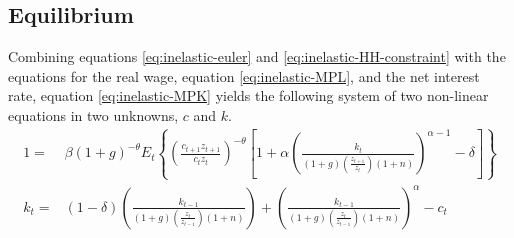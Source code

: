 \documentclass[11pt]{article}
\begin{document}
\subsection{Equilibrium}
Combining equations \ref{eq:inelastic-euler} and \ref{eq:inelastic-HH-constraint} with the equations for the real wage, equation \ref{eq:inelastic-MPL}, and the net interest rate, equation \ref{eq:inelastic-MPK} yields the following system of two non-linear equations in two unknowns, $c$ and $k$.%
	\begin{align}
		1=& \beta(1+g)^{-\theta} E_{t}\left\{\left(\frac{c_{t+1}z_{t+1}}{c_t z_t}\right)^{-\theta}\left[1 + \alpha \left(\frac{k_{t}}{(1 + g)\left(\frac{z_{t+1}}{z_t}\right)(1 + n)}\right)^{\alpha-1} - \delta\right]\right\} \\
		k_t =& (1 - \delta)\left(\frac{k_{t-1}}{(1 + g)\left(\frac{z_t}{z_{t-1}}\right)(1 + n)}\right) +  \left(\frac{k_{t-1}}{(1 + g)\left(\frac{z_t}{z_{t-1}}\right)(1 + n)}\right)^{\alpha} - c_t
	 \end{align}
	 
\end{document}
